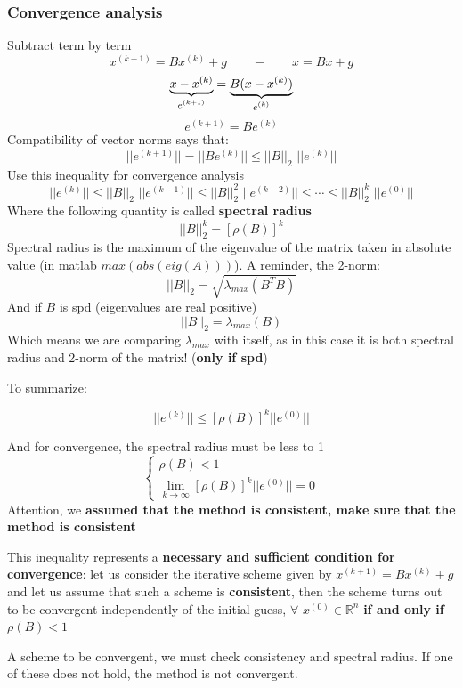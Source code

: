     \subsubsection{Convergence analysis}
    Subtract term by term
    $$
    x^{(k+1)}=Bx^{(k)}+g\qquad -\qquad x=Bx+g
    $$
    $$
    \underlabel{x-x^{(k)}}{$e^{(k+1)}$}=\underlabel{B(x-x^{(k)})}{$e^{(k)}$}
    $$
    $$
    e^{(k+1)}=Be^{(k)}
    $$
    Compatibility of vector norms says that:
    $$
    ||e^{(k+1)}||=||Be^{(k)}||\leq ||B||_2\,\,||e^{(k)}||
    $$
    Use this inequality for convergence analysis
    $$
    ||e^{(k)}||\leq ||B||_2\,\,||e^{(k-1)}||
    \leq
    ||B||_2^2\,\,||e^{(k-2)}||
    \leq
    \cdots
    \leq
    ||B||_2^k\,\,||e^{(0)}||
    $$
    Where the following quantity is called \textbf{spectral radius}
    $$
    ||B||_2^k=[\rho(B)]^k
    $$
    Spectral radius is the maximum of the eigenvalue of the matrix taken in absolute value (in matlab $max(abs(eig(A)))$). A reminder, the 2-norm:
    $$
    ||B||_2=\sqrt{\lambda_{max}(B^TB)}
    $$
    And if $B$ is spd (eigenvalues are real positive)
    $$||B||_2=\lambda_{max}(B)$$
    Which means we are comparing $\lambda_{max}$ with itself, as in this case it is both spectral radius and 2-norm of the matrix! (\textbf{only if spd})

    To summarize:
    \begin{LARGE}
        $$
        ||e^{(k)}||\leq\left[\rho(B)\right]^k||e^{(0)}||
        $$
    \end{LARGE}
    And for convergence, the spectral radius must be less to 1
    $$
    \begin{cases}
        \rho(B)<1\\
        \lim_{k\rightarrow\infty}\left[\rho(B)\right]^k||e^{(0)}||=0
    \end{cases}
    $$
    Attention, we \textbf{assumed that the method is consistent, make sure that the method is consistent}

    This inequality represents a \textbf{necessary and sufficient condition for convergence}: let us consider the iterative scheme given by $x^{(k+1)}=Bx^{(k)}+g$ and let us assume that such a scheme is \textbf{consistent}, then the scheme turns out to be convergent independently of the initial guess, $\forall\,\,x^{(0)}\in\mathbb{R}^n$ \textbf{if and only if} $\rho(B)<1$

    A scheme to be convergent, we must check consistency and spectral radius. If one of these does not hold, the method is not convergent.

